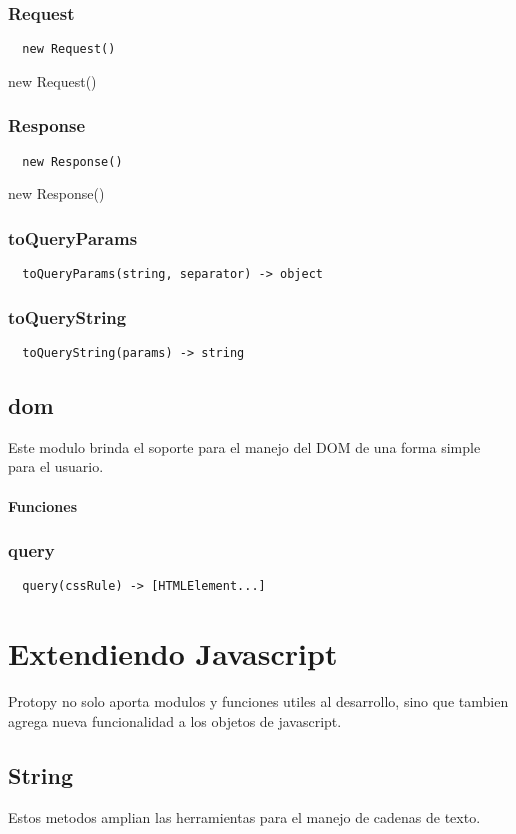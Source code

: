 \subsubsection*{Request}
\begin{verbatim}
  new Request()
\end{verbatim}
new Request()
\subsubsection*{Response}
\begin{verbatim}
  new Response()
\end{verbatim}
new Response()
\subsubsection*{toQueryParams}
\begin{verbatim}
  toQueryParams(string, separator) -> object
\end{verbatim}
\subsubsection*{toQueryString}
\begin{verbatim}
  toQueryString(params) -> string
\end{verbatim}

\subsection{dom}
Este modulo brinda el soporte para el manejo del DOM de una forma simple para el
usuario.
\paragraph{Funciones}
\subsubsection*{query}
\begin{verbatim}
  query(cssRule) -> [HTMLElement...]
\end{verbatim}

\section{Extendiendo Javascript}
Protopy no solo aporta modulos y funciones utiles al desarrollo, sino que
tambien agrega nueva funcionalidad a los objetos de javascript.

\subsection{String}
Estos metodos amplian las herramientas para el manejo de cadenas de texto.
